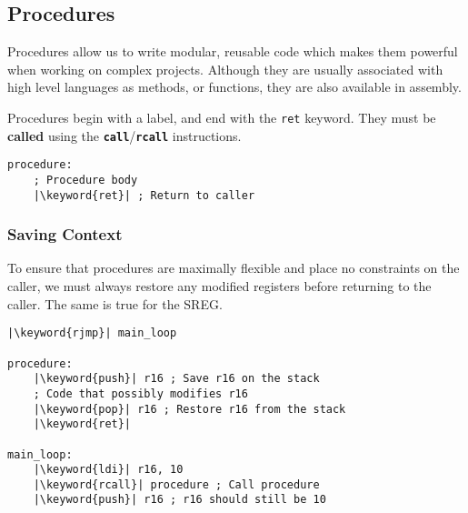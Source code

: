 \documentclass{article}
\newcommand{\keyword}[1]{\textcolor[rgb]{0.00,0.50,0.00}{\textbf{#1}}}
\newcommand{\keywordinline}[1]{\textcolor[rgb]{0.00,0.50,0.00}{\textbf{\texttt{#1}}}}
\begin{document}
\subsection{Procedures}
Procedures allow us to write modular, reusable code which makes them
powerful when working on complex projects. Although they are usually
associated with high level languages as methods, or functions, they are
also available in assembly.

Procedures begin with a label, and end with the \texttt{ret}
keyword. They must be \textbf{called} using the
\keywordinline{call}/\keywordinline{rcall} instructions.
\begin{verbatim}
procedure:
    ; Procedure body
    |\keyword{ret}| ; Return to caller
\end{verbatim}
\subsubsection{Saving Context}
To ensure that procedures are maximally flexible and place no
constraints on the caller, we must always restore any modified
registers before returning to the caller. The same is true for the
SREG\@.
\begin{verbatim}
|\keyword{rjmp}| main_loop

procedure:
    |\keyword{push}| r16 ; Save r16 on the stack
    ; Code that possibly modifies r16
    |\keyword{pop}| r16 ; Restore r16 from the stack
    |\keyword{ret}|

main_loop:
    |\keyword{ldi}| r16, 10
    |\keyword{rcall}| procedure ; Call procedure
    |\keyword{push}| r16 ; r16 should still be 10
\end{verbatim}
\end{document}
